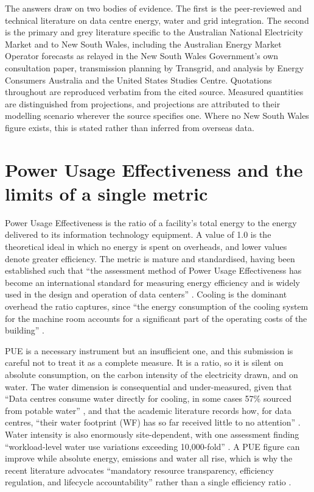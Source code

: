 The answers draw on two bodies of evidence. The first is the peer-reviewed and technical literature on data centre energy, water and grid integration. The second is the primary and grey literature specific to the Australian National Electricity Market and to New South Wales, including the Australian Energy Market Operator forecasts as relayed in the New South Wales Government's own consultation paper, transmission planning by Transgrid, and analysis by Energy Consumers Australia and the United States Studies Centre. Quotations throughout are reproduced verbatim from the cited source. Measured quantities are distinguished from projections, and projections are attributed to their modelling scenario wherever the source specifies one. Where no New South Wales figure exists, this is stated rather than inferred from overseas data.

\section{Power Usage Effectiveness and the limits of a single metric}
\label{sec:supp:pue-defn}

Power Usage Effectiveness is the ratio of a facility's total energy to the energy delivered to its information technology equipment. A value of 1.0 is the theoretical ideal in which no energy is spent on overheads, and lower values denote greater efficiency. The metric is mature and standardised, having been established such that \enquote{the assessment method of Power Usage Effectiveness has become an international standard for measuring energy efficiency and is widely used in the design and operation of data centers} \autocite{uanovAnalysisMethodsAssessing2022}. Cooling is the dominant overhead the ratio captures, since \enquote{the energy consumption of the cooling system for the machine room accounts for a significant part of the operating costs of the building} \autocite{uanovAnalysisMethodsAssessing2022}.

PUE is a necessary instrument but an insufficient one, and this submission is careful not to treat it as a complete measure. It is a ratio, so it is silent on absolute consumption, on the carbon intensity of the electricity drawn, and on water. The water dimension is consequential and under-measured, given that \enquote{Data centres consume water directly for cooling, in some cases 57\% sourced from potable water} \autocite{myttonDataCentreWater2021}, and that the academic literature records how, for data centres, \enquote{their water footprint (WF) has so far received little to no attention} \autocite{risticWaterFootprintData2015}. Water intensity is also enormously site-dependent, with one assessment finding \enquote{workload-level water use variations exceeding 10,000-fold} \autocite{leiWaterUseData2025}. A PUE figure can improve while absolute energy, emissions and water all rise, which is why the recent literature advocates \enquote{mandatory resource transparency, efficiency regulation, and lifecycle accountability} rather than a single efficiency ratio \autocite{imanHiddenCostsIntelligence2025}.

